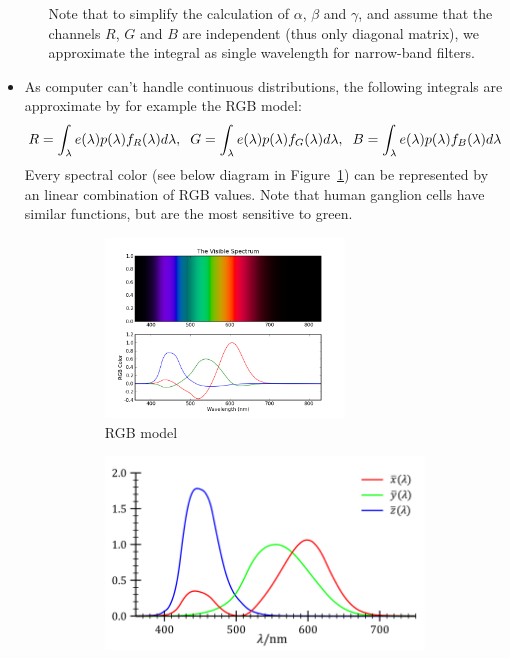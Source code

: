 \begin{itemize}
\begin{itemize}
		Note that to simplify the calculation of $\alpha$, $\beta$ and $\gamma$, and assume that the channels $R$, $G$ and $B$ are independent (thus only diagonal matrix), we approximate the integral as single wavelength for narrow-band filters.
	\end{itemize}
	\item As computer can't handle continuous distributions, the following integrals are approximate by for example the RGB model:
	$$R = \int_\lambda e(\lambda) p(\lambda) f_R(\lambda) d\lambda, \hspace{2mm}G = \int_\lambda e(\lambda) p(\lambda) f_G(\lambda) d\lambda, \hspace{2mm}B = \int_\lambda e(\lambda) p(\lambda) f_B(\lambda) d\lambda$$
	Every spectral color (see below diagram in Figure~\ref{fig:rgb_color_wavelength_distribution_RGB}) can be represented by an linear combination of RGB values.
	Note that human ganglion cells have similar functions, but are the most sensitive to green.
	\begin{figure}[ht!]
		\centering
		\begin{subfigure}[b]{0.4\textwidth}
			\centering
			\includegraphics[width=0.75\textwidth]{figures/cv_image_formation_color_RGB_model.png}
			\caption{RGB model}
			\label{fig:rgb_color_wavelength_distribution_RGB}
		\end{subfigure}
		\begin{subfigure}[b]{0.24\textwidth}
			\centering
			\includegraphics[width=\textwidth]{figures/cv_image_formation_color_XYZ_model.png}

\end{subfigure}
\end{figure}
\end{itemize}
